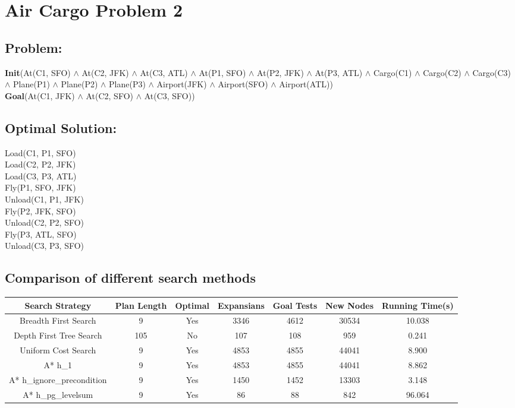 \documentclass[]{article}
\begin{document}
\section{Air Cargo Problem 2}
\subsection*{Problem:}
\textbf{Init}(At(C1, SFO) $ \wedge $ At(C2, JFK) $ \wedge $ At(C3, ATL) 
$ \wedge $ At(P1, SFO) $ \wedge $ At(P2, JFK) $ \wedge $ At(P3, ATL) 
$ \wedge $ Cargo(C1) $ \wedge $ Cargo(C2) $ \wedge $ Cargo(C3)
$ \wedge $ Plane(P1) $ \wedge $ Plane(P2) $ \wedge $ Plane(P3)
$ \wedge $ Airport(JFK) $ \wedge $ Airport(SFO) $ \wedge $ Airport(ATL))\\
\textbf{Goal}(At(C1, JFK) $ \wedge $ At(C2, SFO) $ \wedge $ At(C3, SFO))
\subsection*{Optimal Solution:}
Load(C1, P1, SFO)\\
Load(C2, P2, JFK)\\
Load(C3, P3, ATL)\\
Fly(P1, SFO, JFK)\\
Unload(C1, P1, JFK)\\
Fly(P2, JFK, SFO)\\
Unload(C2, P2, SFO)\\
Fly(P3, ATL, SFO)\\
Unload(C3, P3, SFO)


\subsection*{Comparison of different search methods}
\begin{table}
	\begin{center}
		\begin{adjustbox}{width=1\textwidth}
			\begin{tabular}{ c | c | c | c | c | c | c }
				\hline
				Search Strategy & Plan Length & Optimal & Expansians & Goal Tests & New Nodes & Running Time(s) \\ \hline
				Breadth First Search & 9 & Yes &  3346 & 4612 & 30534 & 10.038 \\ \hline
				Depth First Tree Search & 105 & No &  107 & 108 & 959 & 0.241 \\ \hline
				Uniform Cost Search & 9 & Yes &  4853 & 4855 & 44041 & 8.900 \\ \hline
				A* h\_1 & 9 & Yes &  4853 & 4855 & 44041 & 8.862 \\ \hline
				A* h\_ignore\_precondition & 9 & Yes &  1450 & 1452 & 13303 & 3.148 \\ \hline
				A* h\_pg\_levelsum & 9 & Yes &  86 & 88 & 842 & 96.064 \\
				\hline
			\end{tabular}
		\end{adjustbox}
	\end{center}
\end{table}
\end{document}
